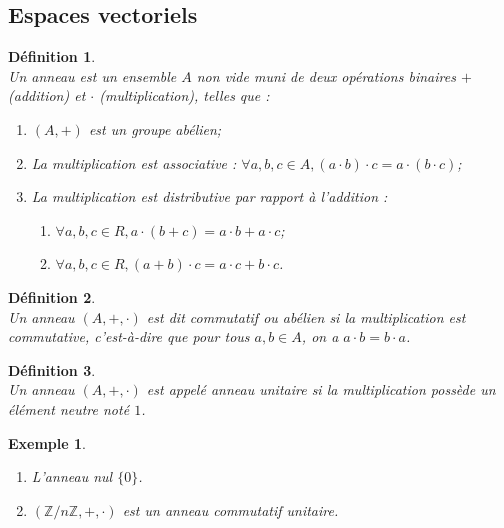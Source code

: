 \documentclass[a4paper, 14pt]{report}
\newtheorem{definition}{Définition}[section]
\newtheorem{example}{Exemple}[section]
\begin{document}
\begin{onehalfspace}
{\subsection{Espaces vectoriels}

\begin{definition} \cite{lang2012algebra}\\
Un anneau est un ensemble \( A \) non vide muni de deux opérations binaires \( + \) (addition) et \( \cdot \) (multiplication), telles que :
	\begin{enumerate} [label=\roman*)]
		\item \( (A, +) \) est un groupe abélien;
		\item La multiplication est associative : \(\forall a, b, c \in A, (a \cdot b) \cdot c = a \cdot (b \cdot c) \);
		\item La multiplication est distributive par rapport à l'addition :
		\begin{enumerate}
			\item \(\forall a, b, c \in R, a \cdot (b + c) = a \cdot b + a \cdot c \);
			\item \(\forall a, b, c \in R, (a + b) \cdot c = a \cdot c + b \cdot c \).
		\end{enumerate}
	\end{enumerate}
\end{definition}

\begin{definition} \cite{lang2012algebra}\\
Un anneau \((A, +, \cdot)\) est dit \emph{commutatif} ou \emph{abélien} si la multiplication est commutative, c'est-à-dire que pour tous \( a, b \in A \), on a \( a \cdot b = b \cdot a \).
\end{definition}

\begin{definition} \cite{lang2012algebra}\\
Un anneau \((A, +, \cdot)\) est appelé anneau unitaire si la multiplication possède un élément neutre noté \( 1 \).
\end{definition}

\begin{example} \
	\begin{enumerate}
		\item L’anneau nul \(\{0\}\).
		\item \((\mathbb{Z}/n\mathbb{Z}, +, \cdot)\) est un anneau commutatif unitaire.
	\end{enumerate}
\end{example}


}
\end{onehalfspace}
\end{document}
